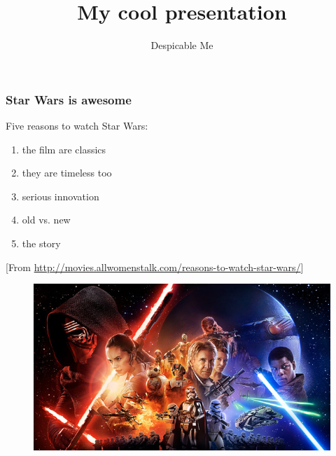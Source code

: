 \documentclass{beamer}
\title{My cool presentation}
\author{Despicable Me}
\begin{document}
\begin{frame}
\maketitle
\end{frame}


\begin{frame}
    \frametitle{Star Wars is awesome}
    
Five reasons to watch Star Wars:

\begin{enumerate}
\item the film are classics
\item they are timeless too
\item serious innovation
\item old vs. new
\item the story
\end{enumerate}

[From \url{http://movies.allwomenstalk.com/reasons-to-watch-star-wars/}]

\end{frame}

\begin{frame}

\begin{figure}
\includegraphics[width=\textwidth]{starwars}
\end{figure}

\end{frame}
\end{document}
